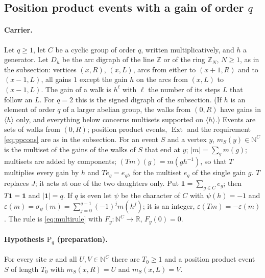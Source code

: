 
\subsection*{Position product events with a gain of order $q$}

\paragraph{Carrier.} Let $q\ge1$, let $C$ be a cyclic group of order $q$, written multiplicatively, and $h$ a generator. Let $D_h$ be the arc digraph of the line $\mathbb{Z}$ or of the ring $\mathbb{Z}_N$, $N\ge1$, as in the subsection: vertices $(x,R)$, $(x,L)$, arcs from either to $(x+1,R)$ and to $(x-1,L)$, all gains $1$ except the gain $h$ on the arcs from $(x,L)$ to $(x-1,L)$. The gain of a walk is $h^{\ell}$ with $\ell$ the number of its steps $L$ that follow an $L$. For $q=2$ this is the signed digraph of the subsection. (If $h$ is an element of order $q$ of a larger abelian group, the walks from $(0,R)$ have gains in $\langle h\rangle$ only, and everything below concerns multisets supported on $\langle h\rangle$.) Events are sets of walks from $(0,R)$; position product events, $\operatorname{Ext}$ and the requirement \eqref{eq:ppcons} are as in the subsection. For an event $S$ and a vertex $y$, $m_S(y)\in\mathbb{N}^C$ is the multiset of the gains of the walks of $S$ that end at $y$; $|m|=\sum_gm(g)$; multisets are added by components; $(Tm)(g)=m(gh^{-1})$, so that $T$ multiplies every gain by $h$ and $Te_g=e_{gh}$ for the multiset $e_g$ of the single gain $g$. $T$ replaces $J$; it acts at one of the two daughters only. Put $\mathbf{1}=\sum_{g\in C}e_g$; then $T\mathbf{1}=\mathbf{1}$ and $|\mathbf{1}|=q$. If $q$ is even let $\psi$ be the character of $C$ with $\psi(h)=-1$ and $\varepsilon(m)=\sigma_\psi(m)=\sum_{j=0}^{q-1}(-1)^jm(h^j)$; it is an integer, $\varepsilon(Tm)=-\varepsilon(m)$. The rule is \eqref{eq:multirule} with $F_y\colon\mathbb{N}^C\to\mathbb{R}$, $F_y(0)=0$.

\paragraph{Hypothesis $\mathrm{P}_q$ (preparation).} For every site $x$ and all $U,V\in\mathbb{N}^C$ there are $T_0\ge1$ and a position product event $S$ of length $T_0$ with $m_S(x,R)=U$ and $m_S(x,L)=V$.

